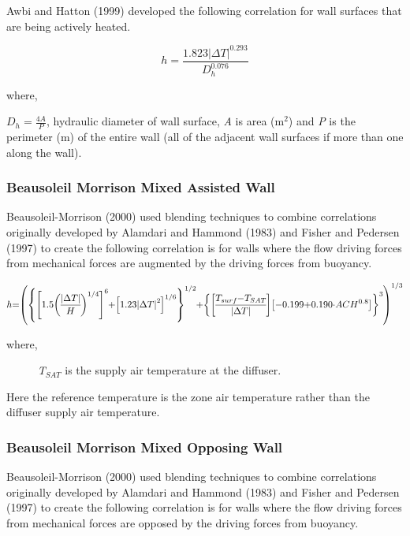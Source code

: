 Awbi and Hatton (1999) developed the following correlation for wall surfaces that are being actively heated.

\begin{equation}
h = \frac{{1.823{{\left| {\Delta T} \right|}^{0.293}}}}{{D_h^{0.076}}}
\end{equation}

where,

\({D_h} = \frac{{4A}}{P}\), hydraulic diameter of wall surface, \emph{A} is area (m\(^{2}\)) and \emph{P} is the perimeter (m) of the entire wall (all of the adjacent wall surfaces if more than one along the wall).

\subsubsection{Beausoleil Morrison Mixed Assisted Wall}\label{beausoleil-morrison-mixed-assisted-wall}

Beausoleil-Morrison (2000) used blending techniques to combine correlations originally developed by Alamdari and Hammond (1983) and Fisher and Pedersen (1997) to create the following correlation is for walls where the flow driving forces from mechanical forces are augmented by the driving forces from buoyancy.

\begin{equation}
\medmuskip=0mu
\thinmuskip=0mu
\thickmuskip=0mu
\nulldelimiterspace=0pt
\scriptspace=0pt
h = \left( 
\left\{
\left[1.5\left(\frac{\left|\Delta T\right|}{H}\right)^{1/4}\right]^6 +
\left[1.23\left|\Delta T\right|^2\right]^{1/6}
\right\}^{1/2} + 
\left\{
\left[\frac{T_{surf}-T_{SAT}}{\left|\Delta T\right|}\right]
\left[-0.199+0.190\cdot ACH^{0.8}\right]
\right\}^3
\right)^{1/3}
\end{equation}

where,

~~~~~ \emph{T\(_{SAT}\)} is the supply air temperature at the diffuser.

Here the reference temperature is the zone air temperature rather than the diffuser supply air temperature.

\subsubsection{Beausoleil Morrison Mixed Opposing Wall}\label{beausoleil-morrison-mixed-opposing-wall}

Beausoleil-Morrison (2000) used blending techniques to combine correlations originally developed by Alamdari and Hammond (1983) and Fisher and Pedersen (1997) to create the following correlation is for walls where the flow driving forces from mechanical forces are opposed by the driving forces from buoyancy.

